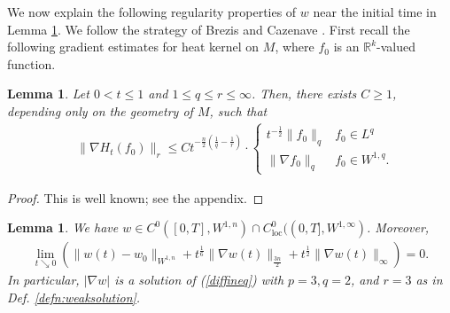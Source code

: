 \documentclass[12pt]{amsart}
\renewcommand{\1}{{\mathbf 1}}
\newcommand{\R}{{\mathbb R}}
\newtheorem{lemma}[thm]{Lemma}
\theoremstyle{others}
\numberwithin{equation}{section}
\begin{document}
   We now explain the following regularity properties of \(w\) near the initial time in Lemma \ref{lemma:checkinghmfisMorreysolution}. We follow the strategy of Brezis and Cazenave \cite[Proof of Theorem 1, pg. 284-286]{breziscazenavesemilinear}.
   First recall the following gradient estimates for heat kernel on \(M\), where \(f_0\) is an \(\R^k\)-valued function.
   \begin{lemma}\label{lemma:gradientestimates}
        Let \(0 < t \leq 1\) and \(1 \leq q \leq r \leq \infty\). Then, there exists \(C \geq 1\), depending only on the geometry of \(M\), such that
   \begin{align*}
       &\|\nabla H_t(f_0)\|_r \leq C t^{-\frac{n}{2}\left(\frac{1}{q} -\frac{1}{r}\right)} \cdot \begin{cases} t^{-\frac12}\|f_0\|_q & f_0 \in L^q\\
       \| \nabla f_0\|_q & f_0 \in W^{1,q}.
       \end{cases}
   \end{align*}
   \end{lemma}
   \begin{proof}
       This is well known; see the appendix.
   \end{proof}
\begin{lemma}\label{lemma:checkinghmfisMorreysolution}
    We have \(w \in C^0([0, T], W^{1, n}) \cap C_{\text{loc}}^0((0, T], W^{1, \infty})\). Moreover, 
    \begin{align*}
        \lim_{t \searrow 0} \left(\|w(t) - w_0\|_{W^{1, n}} + t^{\frac{1}{6}}\|\nabla w(t)\|_{\frac{3n}{2}} + t^{\frac{1}{2}}\|\nabla w(t)\|_{\infty}\right) = 0.
    \end{align*} In particular, \(|\nabla w|\) is a solution of (\ref{diffineq}) with \(p = 3, q = 2\), and \(r = 3\) as in Def. \ref{defn:weaksolution}.
\end{lemma}
\end{document}

